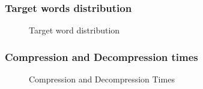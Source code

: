 \documentclass[article,dr=phil,type=drfinal,colorback,accentcolor=tud9c]{tudthesis}
\begin{document}
\subsubsection{Target words distribution}
\begin{figure}[!htb]
	\centering
	\hspace{10mm}
	\caption[Target words distribution]{Target word distribution}
	\label{fig:targetworddist}
\end{figure}

\subsubsection{Compression and Decompression times}
\begin{figure}[!htb]
	\centering
	\hspace{10mm}
	\caption[Compression and Decompression Times]{Compression and Decompression Times}
	\label{fig:compdecomp}
\end{figure}
\newpage
\end{document}
